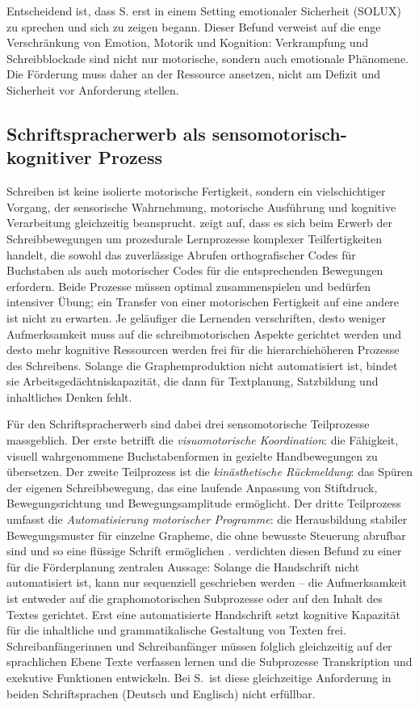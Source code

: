\documentclass[ngerman, a4paper]{article}
\begin{document}
Entscheidend ist, dass S. erst in einem Setting emotionaler Sicherheit (SOLUX) zu
sprechen und sich zu zeigen begann. Dieser Befund verweist auf die enge Verschränkung
von Emotion, Motorik und Kognition: Verkrampfung und Schreibblockade sind nicht nur
motorische, sondern auch emotionale Phänomene. Die Förderung muss daher an der
Ressource ansetzen, nicht am Defizit und Sicherheit vor Anforderung stellen.


\subsection{Schriftspracherwerb als sensomotorisch-kognitiver Prozess}

Schreiben ist keine isolierte motorische Fertigkeit, sondern ein vielschichtiger Vorgang,
der sensorische Wahrnehmung, motorische Ausführung und kognitive Verarbeitung
gleichzeitig beansprucht.
\textcite[S.\,2--3]{hurschler2020handschriftbeurteilung} zeigt auf, dass es sich beim
Erwerb der Schreibbewegungen um prozedurale Lernprozesse komplexer Teilfertigkeiten
handelt, die sowohl das zuverlässige Abrufen orthografischer Codes für Buchstaben als
auch motorischer Codes für die entsprechenden Bewegungen erfordern. Beide Prozesse
müssen optimal zusammenspielen und bedürfen intensiver Übung; ein Transfer von einer
motorischen Fertigkeit auf eine andere ist nicht zu erwarten. Je geläufiger die
Lernenden verschriften, desto weniger Aufmerksamkeit muss auf die schreibmotorischen
Aspekte gerichtet werden und desto mehr kognitive Ressourcen werden frei für die
hierarchiehöheren Prozesse des Schreibens. Solange die Graphemproduktion nicht
automatisiert ist, bindet sie Arbeitsgedächtniskapazität, die dann für Textplanung,
Satzbildung und inhaltliches Denken fehlt.

Für den Schriftspracherwerb sind dabei drei sensomotorische Teilprozesse massgeblich.
Der erste betrifft die \textit{visuomotorische Koordination}: die Fähigkeit, visuell
wahrgenommene Buchstabenformen in gezielte Handbewegungen zu übersetzen. Der zweite
Teilprozess ist die \textit{kinästhetische Rückmeldung}: das Spüren der eigenen
Schreibbewegung, das eine laufende Anpassung von Stiftdruck, Bewegungsrichtung und
Bewegungsamplitude ermöglicht. Der dritte Teilprozess umfasst die
\textit{Automatisierung motorischer Programme}: die Herausbildung stabiler
Bewegungsmuster für einzelne Grapheme, die ohne bewusste Steuerung abrufbar sind und
so eine flüssige Schrift ermöglichen
\parencite[S.\,125--138]{nottbusch2017graphomotorik}.
\textcite[S.\,1\,f.]{saegesserwyss2021grafinkrahmenmodell} verdichten diesen
Befund zu einer für die Förderplanung zentralen Aussage: Solange die Handschrift
nicht automatisiert ist, kann nur sequenziell geschrieben werden -- die
Aufmerksamkeit ist entweder auf die graphomotorischen Subprozesse oder auf den
Inhalt des Textes gerichtet. Erst eine automatisierte Handschrift setzt kognitive
Kapazität für die inhaltliche und grammatikalische Gestaltung von Texten frei.
Schreibanfängerinnen und Schreibanfänger müssen folglich gleichzeitig auf der
sprachlichen Ebene Texte verfassen lernen und die Subprozesse Transkription und
exekutive Funktionen entwickeln. Bei S.\ ist diese gleichzeitige Anforderung in
beiden Schriftsprachen (Deutsch und Englisch) nicht erfüllbar.
\end{document}
